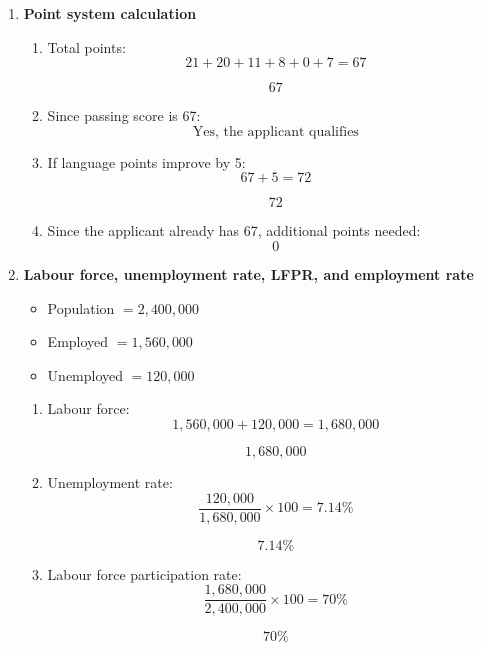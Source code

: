 \documentclass[12pt]{article}
\begin{document}
\begin{enumerate}[label=\textbf{Question \arabic*.}]
\begin{enumerate}[label=(\alph*)]
    \[
    \boxed{83.33\%}
    \]
\end{enumerate}


\item \textbf{Point system calculation}

\begin{enumerate}[label=(\alph*)]
    \item Total points:
    \[
    21+20+11+8+0+7=67
    \]

    \[
    \boxed{67}
    \]

    \item Since passing score is 67:
    \[
    \boxed{\text{Yes, the applicant qualifies}}
    \]

    \item If language points improve by 5:
    \[
    67+5=72
    \]

    \[
    \boxed{72}
    \]

    \item Since the applicant already has 67, additional points needed:
    \[
    \boxed{0}
    \]
\end{enumerate}


\item \textbf{Labour force, unemployment rate, LFPR, and employment rate}

\begin{itemize}
    \item Population \(=2{,}400{,}000\)
    \item Employed \(=1{,}560{,}000\)
    \item Unemployed \(=120{,}000\)
\end{itemize}

\begin{enumerate}[label=(\alph*)]
    \item Labour force:
    \[
    1{,}560{,}000+120{,}000=1{,}680{,}000
    \]

    \[
    \boxed{1{,}680{,}000}
    \]

    \item Unemployment rate:
    \[
    \frac{120{,}000}{1{,}680{,}000}\times 100 = 7.14\%
    \]

    \[
    \boxed{7.14\%}
    \]

    \item Labour force participation rate:
    \[
    \frac{1{,}680{,}000}{2{,}400{,}000}\times 100 = 70\%
    \]

    \[
    \boxed{70\%}
    \]


\end{enumerate}
\end{enumerate}
\end{document}
